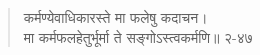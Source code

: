 \documentclass[12pt]{article}
\begin{document}
\begin{quotation}\deva
कर्मण्येवाधिकारस्ते मा फलेषु कदाचन।\\
मा कर्मफलहेतुर्भूर्मा ते सङ्गोऽस्त्वकर्मणि॥ २-४७
\end{quotation}
\end{document}
